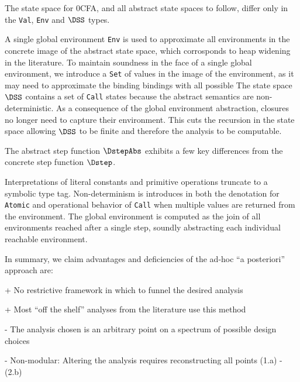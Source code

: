 The state space for 0CFA, and all abstract state spaces to follow,
differ only in the \lstinline|Val|, \lstinline|Env| and $\DSS$ types.
%
\begin{donotbreak}

\end{donotbreak}
%
A single global environment \lstinline|Env| is used to approximate all
environments in the concrete image of the abstract state space, which
corrosponds to heap widening in the literature\cite{shivers:1991:cfa}.
%
To maintain soundness in the face of a single global environment, we introduce
a \lstinline|Set| of values in the image of the environment, as it may need to
approximate the binding bindings with all possible 
%
The state space $\DSS$ contains a set of \lstinline|Call| states
because the abstract semantics are non-deterministic.
%
As a consequence of the global environment abstraction, closures no longer
need to capture their environment.
%
This cuts the recursion in the state space allowing $\DSS$ to be finite and
therefore the analysis to be computable.


The abstract step function $\DstepAbs$ exhibits a few key differences from the
concrete step function $\Dstep$.
%

%
Interpretations of literal constants and primitive operations truncate to a
symbolic type tag.
%
Non-determinism is introduces in both the denotation for \lstinline|Atomic| and
operational behavior of \lstinline|Call| when multiple values are returned from
the environment.
%
The global environment is computed as the join of all environments reached
after a single step, soundly abstracting each individual reachable environment.


In summary, we claim advantages and deficiencies of the ad-hoc ``a posteriori''
approach are:
\begin{itemizenobreak}
\item + No restrictive framework in which to funnel the desired analysis
\item + Most ``off the shelf'' analyses from the literature use this method
\item - The analysis chosen is an arbitrary point on a spectrum of possible design choices
\item - Non-modular: Altering the analysis requires reconstructing all points (1.a) - (2.b)
\end{itemizenobreak}



